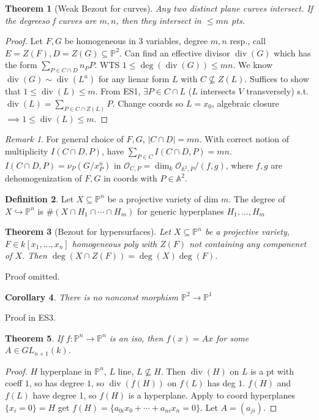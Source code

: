 \documentclass{article}
\theoremstyle{definition}
\newtheorem{defn}{Definition}[section]
\theoremstyle{remark}
\newtheorem{rem}{Remark}
\theoremstyle{plain}
\newtheorem{thm}[defn]{Theorem}
\newtheorem{crly}[defn]{Corollary}
\newcommand{\PP}{\mathbb{P}}
\newcommand{\bA}{\mathbb{A}}
\begin{document}
\begin{thm}[Weak Bezout for curves]
    Any two distinct plane curves intersect. If the degreeso f curves are $m,n$, then they intersect in $\le mn$ pts.
\end{thm}
\begin{proof}
    Let $F,G$ be homogeneous in 3 variables, degree $m,n$ resp., call $E=Z(F), D=Z(G)\subseteq\PP^2$. Can find an effective divisor $\operatorname{div}(G)$ which has the form $\sum_{P\in C\cap D}n_PP$. WTS $1\le \deg(\operatorname{div}(G))\le mn$. We know $\operatorname{div}(G)\sim\operatorname{div}(L^n)$ for any lienar form $L$ with $C\not\subseteq Z(L)$. Suffices to show that $1\le \operatorname{div}(L)\le m$. From ES1, $\exists P\in C\cap L$ ($L$ intersects $V$ transversely) s.t. $\operatorname{div}(L)=\sum_{P\in C\cap Z(L)}P$. Change coords so $L=x_0$, algebraic closure $\implies 1\le \operatorname{div}(L)\le m$.
\end{proof}
\begin{rem}
    For general choice of $F,G$, $|C\cap D|=mn$. With correct notion of multiplicity $I(C\cap D,P)$, have $\sum_{P\in C}I(C\cap D,P)=mn$. $I(C\cap D,P)=\nu_P(G/x_P^n)$ in $\mathcal O_{C,P}=\dim_k\mathcal O_{\bA^2,P}/(f,g)$, where $f,g$ are dehomogenization of $F,G$ in coords with $P\in\bA^2$.
\end{rem}
\begin{defn}
    Let $X\subseteq\PP^n$ be a projective variety of dim $m$. The degree of $X\hookrightarrow \PP^n$ is $\#(X\cap H_1\cap \cdots\cap H_m)$ for generic hyperplanes $H_1,...,H_m$
\end{defn}
\begin{thm}[Bezout for hypersurfaces]
    Let $X\subseteq\PP^n$ be a projective variety, $F\in k[x_1,...,x_n]$ homogeneous poly with $Z(F)$ not containing any componenet of $X$. Then $\deg(X\cap Z(F))=\deg(X)\deg(F)$.
\end{thm}
Proof omitted.
\begin{crly}
    There is no nonconst morphism $\PP^2\to\PP^1$
\end{crly}
Proof in ES3.
\begin{thm}
    If $f:\PP^n\to\PP^n$ is an iso, then $f(x)=Ax$ for some $A\in GL_{n+1}(k)$.
\end{thm}
\begin{proof}
    $H$ hyperplane in $\PP^n$, $L$ line, $L\not\subseteq H$. Then $\operatorname{div}(H)$ on $L$ is a pt with coeff $1$, so has degree $1$, so $\operatorname{div}(f(H))$ on $f(L)$ has deg $1$. $f(H)$ and $f(L)$ have degree 1, so $f(H)$ is a hyperplane. Apply to coord hyperplanes $\{x_i=0\}=H$ get $f(H)=\{a_{0i}x_0+\cdots+a_{ni}x_n=0\}$. Let $A=(a_{ji})$.
\end{proof}
\end{document}
